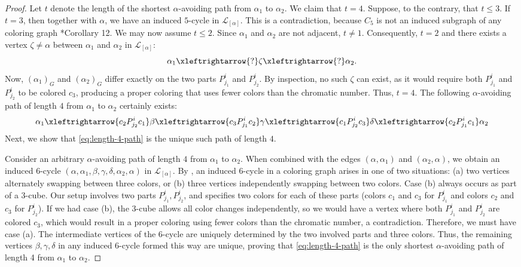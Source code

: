 \documentclass{amsart}
\theoremstyle{hypothesisstyle}
\theoremstyle{definition}
\theoremstyle{remark}
\numberwithin{equation}{section}
\begin{document}
\begin{proof} 
Let $t$ denote the length of the shortest $\alpha$-avoiding path from $\alpha_1$ to  $\alpha_2$. We claim that $t=4$. Suppose, to the contrary, that $t\leq 3$. If $t=3$, then together with $\alpha$, we have an induced $5$-cycle in $\mathcal{L}_{[\alpha]}$. This is a contradiction, because $C_5$ is not an induced subgraph of any coloring graph \cite{BFHRS16}*{Corollary 12}. We may now assume $t\leq 2$. Since $\alpha_1$ and $\alpha_2$ are not adjacent, $t\neq 1$. Consequently, $t=2$ and there exists a vertex $\zeta\neq \alpha$ between $\alpha_1$ and $\alpha_2$ in $\mathcal{L}_{[\alpha]}$:  
\[ \alpha_1 
 \xleftrightarrow{?}  \zeta  \xleftrightarrow{?} \alpha_2.
\]
Now, $(\alpha_1)_{G}$ and $(\alpha_2)_{G}$ differ exactly on the two parts $P^i_{j_1}$ and $P^i_{j_2}$. By inspection, no such $\zeta$ can exist, as it would require both $P_{j_1}^i$ and $P_{j_2}^i$ to be colored $c_3$, producing a proper coloring that uses fewer colors than the chromatic number. Thus, $t=4$. The following $\alpha$-avoiding path of length $4$ from $\alpha_1$ to $\alpha_2$ certainly exists:
\begin{equation}\label{eq:length-4-path}
\alpha_1\xleftrightarrow{c_2P^i_{j_2}c_1} \beta\xleftrightarrow{c_3P^i_{j_1}c_2}\gamma \xleftrightarrow{c_1P^i_{j_2}c_3} \delta\xleftrightarrow{c_2P^i_{j_1}c_1} \alpha_2
\end{equation}
Next, we show that \eqref{eq:length-4-path} is the unique such path of length $4$. 

Consider an arbitrary $\alpha$-avoiding path of length $4$ from $\alpha_1$ to $\alpha_2$. When combined with the edges $(\alpha, \alpha_1)$ and $(\alpha_2, \alpha)$, we obtain an induced $6$-cycle $(\alpha, \alpha_1, \beta, \gamma, \delta, \alpha_2, \alpha)$ in $\mathcal{L}_{[\alpha]}$. By \cite{ABFR18}, an induced 6-cycle in a coloring graph arises in one of two situations: (a) two vertices alternately swapping between three colors, or (b) three vertices independently swapping between two colors. Case (b) always occurs as part of a $3$-cube. Our setup involves two parts $P_{j_1}^{i}, P_{j_2}^{i}$, and specifies two colors for each of these parts (colors $c_1$ and $c_3$ for $P_{j_1}^i$ and colors $c_2$ and $c_3$ for $P_{j_2}^i$).  If we had case (b), the 3-cube allows all color changes independently, so we would have a vertex where both $P_{j_1}^i$ and $P_{j_2}^i$ are colored $c_3$, which would result in a proper coloring using fewer colors than the chromatic number, a contradiction. Therefore, we must have case (a). The intermediate vertices of the 6-cycle are uniquely determined by the two involved parts and three colors. Thus, the remaining vertices $\beta, \gamma, \delta$ in any induced 6-cycle formed this way are unique, proving that \eqref{eq:length-4-path} is the only shortest $\alpha$-avoiding path of length 4 from $\alpha_1$ to $\alpha_2$. \end{proof}
\end{document}
